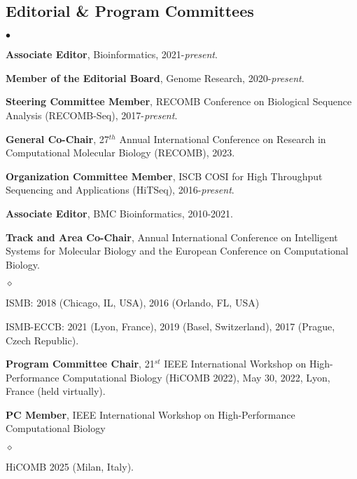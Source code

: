 \documentclass[margin,line]{res}
\newenvironment{list2}{
  \begin{list}{$\bullet$}{%
      \setlength{\itemsep}{0.1cm}
      \setlength{\parsep}{0in} \setlength{\parskip}{0in}
      \setlength{\topsep}{0in} \setlength{\partopsep}{0in} 
      \setlength{\leftmargin}{0.2in}}}{\end{list}}
\newenvironment{list3}{
  \begin{list}{$\diamond$}{%
      \setlength{\itemsep}{0in}
      \setlength{\parsep}{0.1cm} \setlength{\parskip}{0.1cm}
      \setlength{\topsep}{0.1cm} \setlength{\partopsep}{0.1cm} 
      \setlength{\leftmargin}{0.2in}}}{\end{list}}
\begin{document}
\begin{resume}
\subsection{\small \sc Editorial \& Program Committees}
\begin{list2}
    \item
        \textbf{Associate Editor}, Bioinformatics, 2021-\textit{present}.

    \item
        \textbf{Member of the Editorial Board}, Genome Research, 2020-\textit{present}.

    \item
        \textbf{Steering Committee Member}, RECOMB Conference on Biological Sequence Analysis (RECOMB-Seq), 2017-{\it present}.

    \item
        \textbf{General Co-Chair}, 27$^{th}$ Annual International Conference on Research in Computational Molecular Biology (RECOMB), 2023.

    \item
        \textbf{Organization Committee Member}, ISCB COSI for High Throughput Sequencing and Applications (HiTSeq), 2016-{\it present}.

    \item
        \textbf{Associate Editor}, BMC Bioinformatics, 2010-2021.

    \item
        \textbf{Track and Area Co-Chair}, Annual International Conference on Intelligent Systems for Molecular Biology and the European Conference on 
        Computational Biology.
        \begin{list3}
            \item ISMB: 2018 (Chicago, IL, USA), 2016 (Orlando, FL, USA)
            \item ISMB-ECCB: 2021 (Lyon, France), 2019 (Basel, Switzerland), 2017 (Prague, Czech Republic).
        \end{list3}
    
    \item 
        \textbf{Program Committee Chair}, 21$^{st}$ IEEE International Workshop on High-Performance Computational Biology (HiCOMB 2022), May 30, 2022, Lyon, France (held virtually).
        
    \item 
        \textbf{PC Member}, IEEE International Workshop on High-Performance Computational Biology
        \begin{list3}
            \item HiCOMB 2025 (Milan, Italy).
        \end{list3}
        

\end{list2}
\end{resume}
\end{document}
